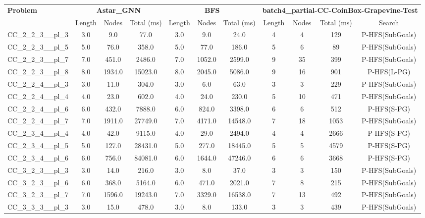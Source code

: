 \begin{table}[!ht]
\centering
\scriptsize
\begin{tabular}{l|ccc|ccc|cccc}
\multirow{2}{*}{\textbf{Problem}} & \multicolumn{3}{c|}{\textbf{Astar\_GNN}} & \multicolumn{3}{c|}{\textbf{BFS}} & \multicolumn{4}{c}{\textbf{batch4\_partial-CC-CoinBox-Grapevine-Test}} \\
\cline{2-11}
& Length & Nodes & Total (ms) & Length & Nodes & Total (ms) & Length & Nodes & Total (ms) & Search \\
\hline
CC\_2\_2\_3\_\_pl\_3 & 3.0 & 9.0 & 77.0 & 3.0 & 9.0 & 24.0 & 4 & 4 & 129 & P-HFS(SubGoals) \\
CC\_2\_2\_3\_\_pl\_5 & 5.0 & 76.0 & 358.0 & 5.0 & 77.0 & 186.0 & 5 & 6 & 89 & P-HFS(SubGoals) \\
CC\_2\_2\_3\_\_pl\_7 & 7.0 & 451.0 & 2486.0 & 7.0 & 1052.0 & 2599.0 & 9 & 35 & 399 & P-HFS(SubGoals) \\
CC\_2\_2\_3\_\_pl\_8 & 8.0 & 1934.0 & 15023.0 & 8.0 & 2045.0 & 5086.0 & 9 & 16 & 901 & P-HFS(L-PG) \\
CC\_2\_2\_4\_\_pl\_3 & 3.0 & 11.0 & 304.0 & 3.0 & 6.0 & 63.0 & 3 & 3 & 229 & P-HFS(SubGoals) \\
CC\_2\_2\_4\_\_pl\_4 & 4.0 & 23.0 & 602.0 & 4.0 & 24.0 & 230.0 & 5 & 10 & 471 & P-HFS(SubGoals) \\
CC\_2\_2\_4\_\_pl\_6 & 6.0 & 432.0 & 7888.0 & 6.0 & 824.0 & 3398.0 & 6 & 6 & 512 & P-HFS(S-PG) \\
CC\_2\_2\_4\_\_pl\_7 & 7.0 & 1911.0 & 27749.0 & 7.0 & 4171.0 & 14548.0 & 7 & 18 & 1053 & P-HFS(SubGoals) \\
CC\_2\_3\_4\_\_pl\_4 & 4.0 & 42.0 & 9115.0 & 4.0 & 29.0 & 2494.0 & 4 & 4 & 2666 & P-HFS(S-PG) \\
CC\_2\_3\_4\_\_pl\_5 & 5.0 & 127.0 & 28431.0 & 5.0 & 277.0 & 18445.0 & 5 & 5 & 4579 & P-HFS(S-PG) \\
CC\_2\_3\_4\_\_pl\_6 & 6.0 & 756.0 & 84081.0 & 6.0 & 1644.0 & 47246.0 & 6 & 6 & 3668 & P-HFS(S-PG) \\
CC\_3\_2\_3\_\_pl\_3 & 3.0 & 14.0 & 216.0 & 3.0 & 8.0 & 37.0 & 3 & 3 & 150 & P-HFS(SubGoals) \\
CC\_3\_2\_3\_\_pl\_6 & 6.0 & 368.0 & 5164.0 & 6.0 & 471.0 & 2021.0 & 7 & 8 & 215 & P-HFS(SubGoals) \\
CC\_3\_2\_3\_\_pl\_7 & 7.0 & 1596.0 & 19243.0 & 7.0 & 3329.0 & 16538.0 & 7 & 13 & 492 & P-HFS(SubGoals) \\
CC\_3\_3\_3\_\_pl\_3 & 3.0 & 15.0 & 478.0 & 3.0 & 8.0 & 133.0 & 3 & 3 & 439 & P-HFS(SubGoals) \\

\end{tabular}
\end{table}
